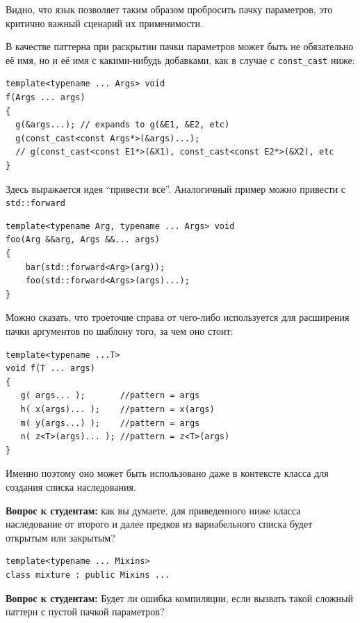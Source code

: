 \documentclass[a4paper,12pt,oneside]{article}
\newif\ifanswers
\begin{document}
Видно, что язык позволяет таким образом пробросить пачку параметров, это критично важный сценарий их применимости.

В качестве паттерна при раскрытии пачки параметров может быть не обязательно её имя, но и её имя с какими-нибудь добавками, как в случае с \lstinline!const_cast! ниже:

\begin{lstlisting}
template<typename ... Args> void 
f(Args ... args)
{
  g(&args...); // expands to g(&E1, &E2, etc)
  g(const_cast<const Args*>(&args)...);
  // g(const_cast<const E1*>(&X1), const_cast<const E2*>(&X2), etc
}
\end{lstlisting}

Здесь выражается идея ``привести все''. Аналогичный пример можно привести с \lstinline!std::forward!

\begin{lstlisting}
template<typename Arg, typename ... Args> void 
foo(Arg &&arg, Args &&... args)
{
    bar(std::forward<Arg>(arg));
    foo(std::forward<Args>(args)...);
}
\end{lstlisting}

Можно сказать, что троеточие справа от чего-либо используется для расширения пачки аргументов по шаблону того, за чем оно стоит:

\begin{lstlisting}
template<typename ...T>
void f(T ... args) 
{
   g( args... );       //pattern = args
   h( x(args)... );    //pattern = x(args)
   m( y(args...) );    //pattern = args
   n( z<T>(args)... ); //pattern = z<T>(args)
}
\end{lstlisting}

Именно поэтому оно может быть использовано даже в контексте класса для создания списка наследования.

\textbf{Вопрос к студентам:} как вы думаете, для приведенного ниже класса наследование от второго и далее предков из вариабельного списка будет открытым или закрытым?

\begin{lstlisting}
template<typename ... Mixins>
class mixture : public Mixins ...  
\end{lstlisting}

\ifanswers
Правильный ответ: открытым, поскольку \lstinline!pattern = public Mixins!
\fi

\textbf{Вопрос к студентам:} Будет ли ошибка компиляции, если вызвать такой сложный паттерн с пустой пачкой параметров?

\ifanswers
Правильный ответ: все будет хорошо.
\fi
\end{document}
